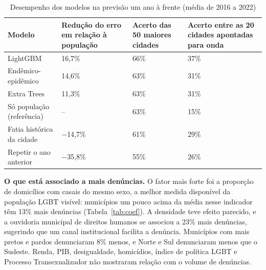 \documentclass[12pt]{article}
\begin{document}
\begin{table}[!htb]
\centering
\caption{Desempenho dos modelos na previsão um ano à frente (média de 2016 a 2022)}
\label{tab:validacao}
{\renewcommand{\arraystretch}{1.2}\small
\begin{tabular}{p{4.6cm} p{2.6cm} p{2.6cm} p{3.0cm}}
\hline
\textbf{Modelo} & \textbf{Redução do erro em relação à população} & \textbf{Acerto das 50 maiores cidades} & \textbf{Acerto entre as 20 cidades apontadas para onda} \\
\hline
LightGBM & 16,7\% & 66\% & 37\% \\
Endêmico-epidêmico & 14,6\% & 63\% & 31\% \\
Extra Trees & 11,3\% & 63\% & 31\% \\
Só população (referência) & -- & 63\% & 15\% \\
Fatia histórica da cidade & $-$14,7\% & 61\% & 29\% \\
Repetir o ano anterior & $-$35,8\% & 55\% & 26\% \\
\hline
\end{tabular}}
\end{table}

\textbf{O que está associado a mais denúncias.} O fator mais forte foi a proporção de domicílios com casais do mesmo sexo, a melhor medida disponível da população LGBT visível: municípios um pouco acima da média nesse indicador têm 13\% mais denúncias (Tabela~\ref{tab:coef}). A densidade teve efeito parecido, e a ouvidoria municipal de direitos humanos se associou a 23\% mais denúncias, sugerindo que um canal institucional facilita a denúncia. Municípios com mais pretos e pardos denunciaram 8\% menos, e Norte e Sul denunciaram menos que o Sudeste. Renda, PIB, desigualdade, homicídios, índice de política LGBT e Processo Transexualizador não mostraram relação com o volume de denúncias.
\end{document}
